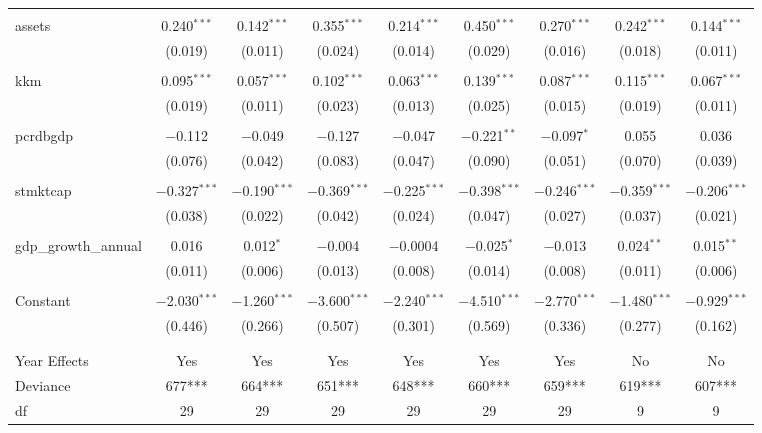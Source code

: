 \documentclass[a4paper,nobind]{templates/ociamthesis}
\begin{document}
\begin{landscape}
\begin{table}[!htbp]
\begin{tabular}{@{\extracolsep{5pt}}lcccccccc}
  & & & & & & & & \\ 
 assets & 0.240$^{***}$ & 0.142$^{***}$ & 0.355$^{***}$ & 0.214$^{***}$ & 0.450$^{***}$ & 0.270$^{***}$ & 0.242$^{***}$ & 0.144$^{***}$ \\ 
  & (0.019) & (0.011) & (0.024) & (0.014) & (0.029) & (0.016) & (0.018) & (0.011) \\ 
  & & & & & & & & \\ 
 kkm & 0.095$^{***}$ & 0.057$^{***}$ & 0.102$^{***}$ & 0.063$^{***}$ & 0.139$^{***}$ & 0.087$^{***}$ & 0.115$^{***}$ & 0.067$^{***}$ \\ 
  & (0.019) & (0.011) & (0.023) & (0.013) & (0.025) & (0.015) & (0.019) & (0.011) \\ 
  & & & & & & & & \\ 
 pcrdbgdp & $-$0.112 & $-$0.049 & $-$0.127 & $-$0.047 & $-$0.221$^{**}$ & $-$0.097$^{*}$ & 0.055 & 0.036 \\ 
  & (0.076) & (0.042) & (0.083) & (0.047) & (0.090) & (0.051) & (0.070) & (0.039) \\ 
  & & & & & & & & \\ 
 stmktcap & $-$0.327$^{***}$ & $-$0.190$^{***}$ & $-$0.369$^{***}$ & $-$0.225$^{***}$ & $-$0.398$^{***}$ & $-$0.246$^{***}$ & $-$0.359$^{***}$ & $-$0.206$^{***}$ \\ 
  & (0.038) & (0.022) & (0.042) & (0.024) & (0.047) & (0.027) & (0.037) & (0.021) \\ 
  & & & & & & & & \\ 
 gdp\_growth\_annual & 0.016 & 0.012$^{*}$ & $-$0.004 & $-$0.0004 & $-$0.025$^{*}$ & $-$0.013 & 0.024$^{**}$ & 0.015$^{**}$ \\ 
  & (0.011) & (0.006) & (0.013) & (0.008) & (0.014) & (0.008) & (0.011) & (0.006) \\ 
  & & & & & & & & \\ 
 Constant & $-$2.030$^{***}$ & $-$1.260$^{***}$ & $-$3.600$^{***}$ & $-$2.240$^{***}$ & $-$4.510$^{***}$ & $-$2.770$^{***}$ & $-$1.480$^{***}$ & $-$0.929$^{***}$ \\ 
  & (0.446) & (0.266) & (0.507) & (0.301) & (0.569) & (0.336) & (0.277) & (0.162) \\ 
  & & & & & & & & \\ 
\hline \\[-1.8ex] 
Year Effects & Yes & Yes & Yes & Yes & Yes & Yes & No & No \\ 
Deviance & 677*** & 664*** & 651*** & 648*** & 660*** & 659*** & 619*** & 607*** \\ 
df & 29 & 29 & 29 & 29 & 29 & 29 & 9 & 9 \\ 

\end{tabular}
\end{table}
\end{landscape}
\end{document}
